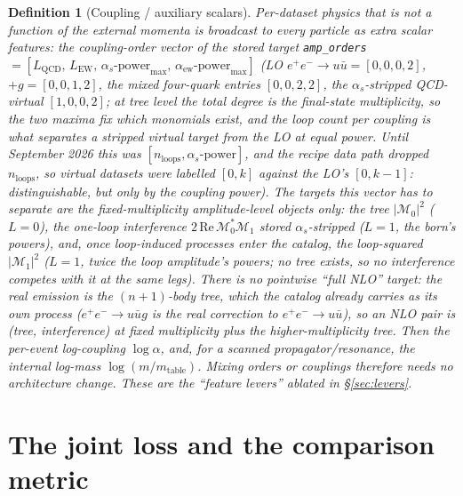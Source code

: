 \documentclass[11pt]{article}
\newcommand{\code}[1]{\texttt{#1}}
\newtheorem{definition}{Definition}
\begin{document}
\begin{definition}[Coupling / auxiliary scalars]\label{def:coup}
Per-dataset physics that is \emph{not} a function of the external momenta is broadcast to
every particle as extra scalar features: the coupling-order vector of the stored target
\code{amp\_orders}$=[L_{\mathrm{QCD}},\,L_{\mathrm{EW}},\,\alpha_s\text{-power}_{\max},\,\alpha_{\mathrm{ew}}\text{-power}_{\max}]$
(LO $e^+e^-\to u\bar u=[0,0,0,2]$, $+g=[0,0,1,2]$, the mixed four-quark entries $[0,0,2,2]$,
the $\alpha_s$-stripped QCD-virtual $[1,0,0,2]$; at tree level the total degree is the
final-state multiplicity, so the two maxima fix which monomials exist, and the loop count per
coupling is what separates a stripped virtual target from the LO at equal power. Until
September 2026 this was $[n_{\mathrm{loops}},\alpha_s\text{-power}]$, and the recipe data
path dropped $n_{\mathrm{loops}}$, so virtual datasets were labelled $[0,k]$ against the LO's
$[0,k-1]$: distinguishable, but only by the coupling power). The targets this vector has to
separate are the fixed-multiplicity amplitude-level objects only: the tree $|\mathcal M_0|^2$
($L{=}0$), the one-loop interference $2\,\mathrm{Re}\,\mathcal M_0^*\mathcal M_1$ stored
$\alpha_s$-stripped ($L{=}1$, the born's powers), and, once loop-induced processes enter the
catalog, the loop-squared $|\mathcal M_1|^2$ ($L{=}1$, twice the loop amplitude's powers; no tree
exists, so no interference competes with it at the same legs). There is no pointwise ``full NLO''
target: the real emission is the $(n{+}1)$-body tree, which the catalog already carries as its own
process ($e^+e^-\to u\bar u g$ is the real correction to $e^+e^-\to u\bar u$), so an NLO
pair is (tree, interference) at fixed multiplicity plus the higher-multiplicity tree. Then the
per-event log-coupling
$\log\alpha$, and, for a scanned propagator/resonance, the internal log-mass
$\log(m/m_{\mathrm{table}})$. Mixing orders or couplings therefore needs no architecture
change. These are the ``feature levers'' ablated in \S\ref{sec:levers}.
\end{definition}

\section{The joint loss and the comparison metric}\label{sec:loss}
\end{document}
